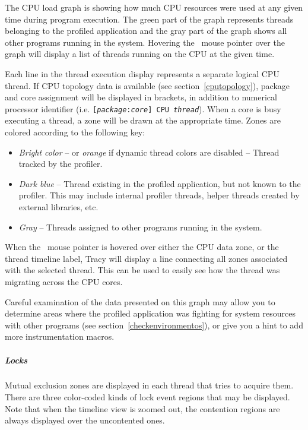 \documentclass[hidelinks,titlepage,a4paper]{article}
\begin{document}
The CPU load graph is showing how much CPU resources were used at any given time during program execution. The green part of the graph represents threads belonging to the profiled application and the gray part of the graph shows all other programs running in the system. Hovering the \faMousePointer{}~mouse pointer over the graph will display a list of threads running on the CPU at the given time.

Each line in the thread execution display represents a separate logical CPU thread. If CPU topology data is available (see section~\ref{cputopology}), package and core assignment will be displayed in brackets, in addition to numerical processor identifier (i.e. \texttt{[\emph{package}:\emph{core}] CPU \emph{thread}}). When a core is busy executing a thread, a zone will be drawn at the appropriate time. Zones are colored according to the following key:

\begin{itemize}
\item \emph{Bright color} -- or \emph{orange} if dynamic thread colors are disabled -- Thread tracked by the profiler.
\item \emph{Dark blue} -- Thread existing in the profiled application, but not known to the profiler. This may include internal profiler threads, helper threads created by external libraries, etc.
\item \emph{Gray} -- Threads assigned to other programs running in the system.
\end{itemize}

When the \faMousePointer{}~mouse pointer is hovered over either the CPU data zone, or the thread timeline label, Tracy will display a line connecting all zones associated with the selected thread. This can be used to easily see how the thread was migrating across the CPU cores.

Careful examination of the data presented on this graph may allow you to determine areas where the profiled application was fighting for system resources with other programs (see section~\ref{checkenvironmentos}), or give you a hint to add more instrumentation macros.

\subparagraph{Locks}

Mutual exclusion zones are displayed in each thread that tries to acquire them. There are three color-coded kinds of lock event regions that may be displayed. Note that when the timeline view is zoomed out, the contention regions are always displayed over the uncontented ones.
\end{document}
